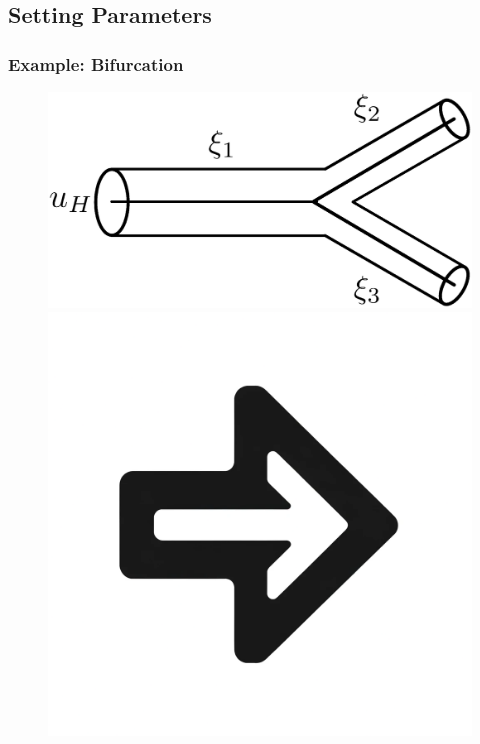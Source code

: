 \documentclass[compress]{beamer}
\begin{document}
\subsection{Setting Parameters}
\begin{frame}
	\frametitle{Example: Bifurcation}
	\begin{figure}
		\begin{center}
			\begin{minipage}[t][0.35\paperheight][t]{\textwidth}
				\begin{minipage}{0.44\textwidth}
					\includegraphics[width=\textwidth]{images/bifurcation.eps}
				\end{minipage}
				\hfill
				\begin{minipage}{0.09\textwidth}
					\includegraphics[width=\textwidth]{images/right_arrow.png}

\end{minipage}
\end{minipage}
\end{center}
\end{figure}
\end{frame}
\end{document}
